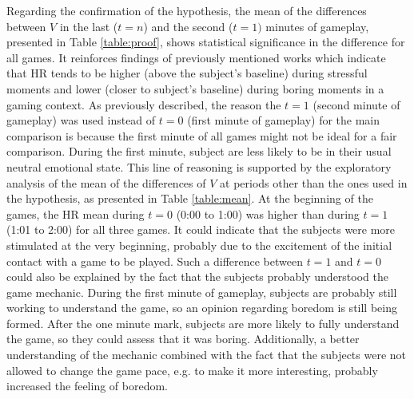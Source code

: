 Regarding the confirmation of the hypothesis, the mean of the differences between $V$ in the last ($t=n$) and the second ($t=1)$ minutes of gameplay, presented in Table \ref{table:proof}, shows statistical significance in the difference for all games. It reinforces findings of previously mentioned works \parencite{vandeput2009heart, garde2002effects, bousefsaf2013remote, rodriguez2015vr, yamakoshi2007preliminary} which indicate that HR tends to be higher (above the subject's baseline) during stressful moments and lower (closer to subject's baseline) during boring moments in a gaming context. As previously described, the reason the $t=1$ (second minute of gameplay) was used instead of $t=0$ (first minute of gameplay) for the main comparison is because the first minute of all games might not be ideal for a fair comparison. During the first minute, subject are less likely to be in their usual neutral emotional state. This line of reasoning is supported by the exploratory analysis of the mean of the differences of $V$ at periods other than the ones used in the hypothesis, as presented in Table \ref{table:mean}. At the beginning of the games, the HR mean during $t=0$ (0:00 to 1:00) was higher than during $t=1$ (1:01 to 2:00) for all three games. It could indicate that the subjects were more stimulated at the very beginning, probably due to the excitement of the initial contact with a game to be played. Such a difference between $t=1$ and $t=0$ could also be explained by the fact that the subjects probably understood the game mechanic. During the first minute of gameplay, subjects are probably still working to understand the game, so an opinion regarding boredom is still being formed. After the one minute mark, subjects are more likely to fully understand the game, so they could assess that it was boring. Additionally, a better understanding of the mechanic combined with the fact that the subjects were not allowed to change the game pace, e.g. to make it more interesting, probably increased the feeling of boredom.



